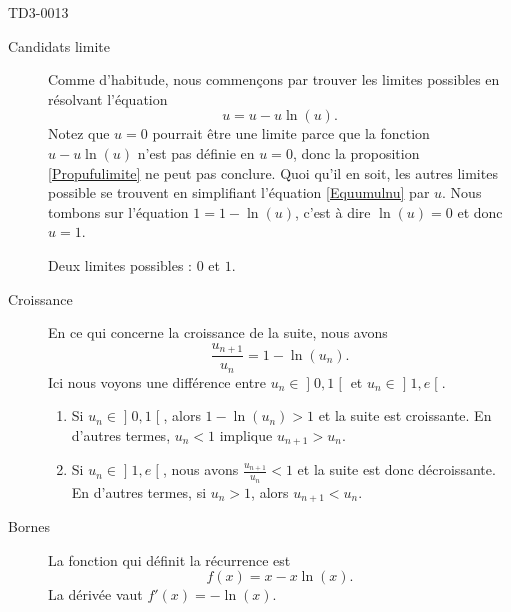 
\begin{corrige}{TD3-0013}

    \begin{description}
        \item[Candidats limite] 

    Comme d'habitude, nous commençons par trouver les limites possibles en résolvant l'équation
    \begin{equation}        \label{Equumulnu}
        u=u-u\ln(u).
    \end{equation}
    Notez que $u=0$ pourrait être une limite parce que la fonction $u-u\ln(u)$ n'est pas définie en $u=0$, donc la proposition \ref{Propufulimite} ne peut pas conclure. Quoi qu'il en soit, les autres limites possible se trouvent en simplifiant l'équation \eqref{Equumulnu} par $u$. Nous tombons sur l'équation $1=1-\ln(u)$, c'est à dire $\ln(u)=0$ et donc $u=1$.

    Deux limites possibles : $0$ et $1$.

        \item[Croissance]

    En ce qui concerne la croissance de la suite, nous avons
    \begin{equation}
        \frac{ u_{n+1} }{ u_n }=1-\ln(u_n).
    \end{equation}
    Ici nous voyons une différence entre $u_n\in\mathopen] 0 , 1 \mathclose[$ et $u_n\in\mathopen] 1 , e \mathclose[$. 
    
    \begin{enumerate}
        \item
            Si $u_n\in\mathopen] 0 , 1 \mathclose[$, alors $1-\ln(u_n)>1$ et la suite est croissante. En d'autres termes, \( u_n<1\) implique \( u_{n+1}>u_n\).

        \item
            Si $u_n\in\mathopen] 1 , e \mathclose[$, nous avons $\frac{ u_{n+1} }{ u_n }<1$ et la suite est donc décroissante. En d'autres termes, si \( u_n>1\), alors \( u_{n+1}<u_n\).
    
            
    \end{enumerate}

        \item[Bornes]

            La fonction qui définit la récurrence est
            \begin{equation}
                f(x)=x-x\ln(x).
            \end{equation}
            La dérivée vaut \( f'(x)=-\ln(x)\).


\end{description}
\end{corrige}
